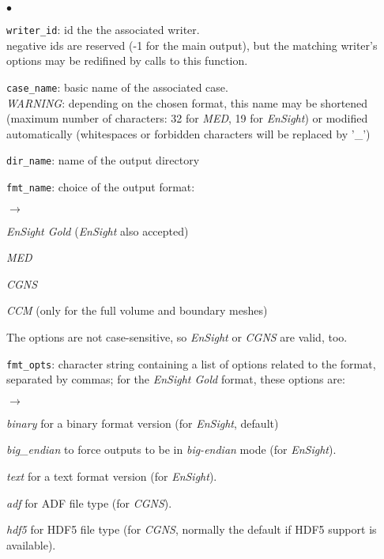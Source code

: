 {{{\begin{list}{$\bullet$}{}
       \item \texttt{writer\_id}: id the the associated writer.\\
             negative ids are reserved (-1 for the main output),
             but the matching writer's options may be redifined by
             calls to this function.
       \item \texttt{case\_name}: basic name of the associated case.\\ {\em
             WARNING}: depending on the chosen format, this name may
             be shortened (maximum number of characters: 32 for {\em MED},
             19 for {\em EnSight}) or modified automatically (whitespaces or
             forbidden characters will be replaced by '\_')
       \item \texttt{dir\_name}: name of the output directory
       \item \texttt{fmt\_name}: choice of the output format:
        \begin{list}{$\rightarrow$}{}
               \item {\em EnSight Gold} ({\em EnSight} also accepted)
               \item {\em MED}
               \item {\em CGNS}
               \item {\em CCM} (only for the full volume and boundary meshes)
         \end{list}
The options are not case-sensitive, so {\em EnSight} or {\em CGNS} are valid, too.
       \item \texttt{fmt\_opts}: character string containing a list of
             options related to the format, separated by commas; for the
             {\em EnSight Gold} format, these options are:
        \begin{list}{$\rightarrow$}{}
               \item {\em binary} for a binary format version (for {\em EnSight}, default)
               \item {\em big\_endian} to force outputs to be in {\em big-endian}
                 mode (for {\em EnSight}).
               \item {\em text} for a text format version (for {\em EnSight}).
               \item {\em adf} for ADF file type (for {\em CGNS}).
               \item {\em hdf5} for HDF5 file type (for {\em CGNS}, normally the
                 default if HDF5 support is available).

\end{list}
\end{list}}}}
